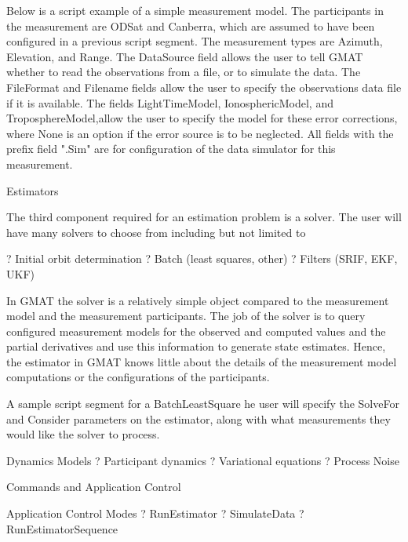 Below is a script example of a simple measurement model.  The
participants in the measurement are ODSat and Canberra, which are
assumed to have been configured in a previous script segment.   The
measurement types are Azimuth, Elevation, and Range.  The DataSource
field allows the user to tell GMAT whether to read the observations
from a file, or to simulate the data. The FileFormat and Filename
fields allow the user to specify the observations data file if it is
available.    The fields  LightTimeModel, IonosphericModel, and
TroposphereModel,allow the user to specify the model for these error
corrections, where None is an option if the error source is to be
neglected.   All fields with the prefix field ".Sim" are for
configuration of the data simulator for this measurement.





Estimators

The third component required for an estimation problem is a solver.
The user will have many solvers to choose from including but not
limited to

?   Initial orbit determination ?   Batch (least squares, other) ?
Filters (SRIF, EKF, UKF)

In GMAT the solver is a relatively simple object compared to the
measurement model and the measurement  participants.  The job of the
solver is to query configured measurement models for the observed
and computed values  and the partial derivatives  and use this
information  to generate state estimates.  Hence,  the estimator in
GMAT knows little about the details of the measurement model
computations or the configurations of the participants.

A sample script segment for a BatchLeastSquare he user will specify
the SolveFor and Consider parameters on the estimator, along with
what measurements they would like the solver to process.

%

Dynamics Models ?   Participant dynamics ?   Variational equations ?
Process Noise

Commands and Application Control

Application Control Modes ?   RunEstimator ?   SimulateData ?
RunEstimatorSequence
